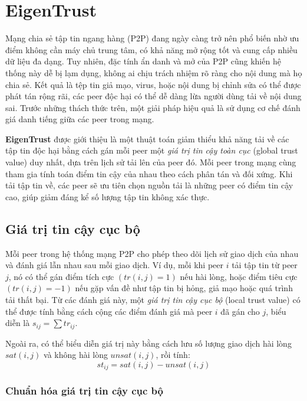 \section{EigenTrust}

Mạng chia sẻ tập tin ngang hàng (P2P) đang ngày càng trở nên phổ biến nhờ ưu điểm không cần máy chủ trung tâm, có khả năng mở rộng tốt và cung cấp nhiều dữ liệu đa dạng.
Tuy nhiên, đặc tính ẩn danh và mở của P2P cũng khiến hệ thống này dễ bị lạm dụng, không ai chịu trách nhiệm rõ ràng cho nội dung mà họ chia sẻ. Kết quả là
tệp tin giả mạo, virus, hoặc nội dung bị chỉnh sửa có thể được phát tán rộng rãi, các peer độc hại có thể dễ dàng lừa người dùng tải về nội dung sai.
Trước những thách thức trên, một giải pháp hiệu quả là sử dụng cơ chế đánh giá danh tiếng giữa các peer trong mạng.

\textbf{EigenTrust} \cite{eigentrust-algorithm-for-reputation-management-in-2p2-networks} được giới thiệu là một thuật toán giảm thiểu khả năng tải về các tập tin độc hại
bằng cách gán mỗi peer một \textit{giá trị tin cậy toàn cục} (global trust value) duy nhất, dựa trên lịch sử tải lên của peer đó. Mỗi peer trong mạng cùng tham gia tính toán điểm tin cậy của nhau
theo cách phân tán và đối xứng. Khi tải tập tin về, các peer sẽ ưu tiên chọn nguồn tải là những peer có điểm tin cậy cao, giúp giảm đáng kể số lượng tập tin không xác thực.

\subsection{Giá trị tin cậy cục bộ}

Mỗi peer trong hệ thống mạng P2P cho phép theo dõi lịch sử giao dịch của nhau và đánh giá lẫn nhau sau mỗi giao dịch. Ví dụ, mỗi khi peer $i$ tải tập tin từ
peer $j$, nó có thể gán điểm tích cực $(tr(i, j) = 1)$ nếu hài lòng, hoặc điểm tiêu cực $(tr(i, j) = -1)$ nếu gặp vấn đề như tập tin bị hỏng, giả mạo hoặc quá trình tải thất bại.
Từ các đánh giá này, một \textit{giá trị tin cậy cục bộ} (local trust value) có thể được tính bằng cách cộng các điểm đánh giá mà peer $i$ đã gán cho $j$, biểu diễn là $s_{ij}=\sum tr_{ij}$.

Ngoài ra, có thể biểu diễn giá trị này bằng cách lưu số lượng giao dịch hài lòng $sat(i, j)$ và không hài lòng $unsat(i, j)$, rồi tính:
\[st_{ij} = sat(i, j) - unsat(i, j)\]

\subsubsection{Chuẩn hóa giá trị tin cậy cục bộ}

